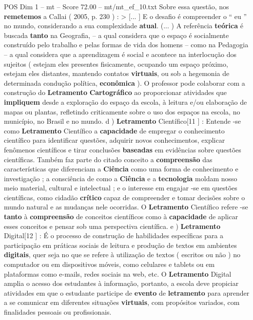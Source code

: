 \begin{textsample}{POS Dim 1 – mt – Score 72.00 – mt/mt\_ef\_10.txt}
Sobre essa questão, nos \textbf{remetemos} a Callai ( 2005, p. 230 ) : > [... ] E o desafio é compreender o “ eu ” no mundo, considerando a sua complexidade \textbf{atual}. (... ) A referência \textbf{teórica} é buscada \textbf{tanto} na Geografia, – a qual considera que o espaço é socialmente construído pelo trabalho e pelas formas de vida dos homens – como na Pedagogia – a qual considera que a aprendizagem é social e acontece na interlocução dos sujeitos ( estejam eles presentes fisicamente, ocupando um espaço próximo, estejam eles distantes, mantendo contatos \textbf{virtuais}, ou sob a hegemonia de determinada condução política, \textbf{econômica} ).
O professor pode colaborar com a construção do \textbf{Letramento} \textbf{Cartográfico} ao proporcionar atividades que \textbf{impliquem} desde a exploração do espaço da escola, à leitura e/ou elaboração de mapas ou plantas, refletindo criticamente sobre o uso dos espaços na escola, no município, no Brasil e no mundo. d ) \textbf{Letramento} Científico[11 ] : Entende -se como \textbf{Letramento} Científico a \textbf{capacidade} de empregar o conhecimento científico para identificar questões, adquirir novos conhecimentos, explicar fenômenos científicos e tirar conclusões \textbf{baseadas} em evidências sobre questões científicas.
Também faz parte do citado conceito a \textbf{compreensão} das características que diferenciam a \textbf{Ciência} como uma forma de conhecimento e investigação ; a consciência de como a \textbf{Ciência} e a \textbf{tecnologia} moldam nosso meio material, cultural e intelectual ; e o interesse em engajar -se em questões científicas, como cidadão \textbf{crítico} capaz de compreender e tomar decisões sobre o mundo natural e as mudanças nele ocorridas.
O \textbf{Letramento} Científico refere -se \textbf{tanto} à \textbf{compreensão} de conceitos científicos como à \textbf{capacidade} de aplicar esses conceitos e pensar sob uma perspectiva científica. e ) \textbf{Letramento} Digital[12 ] : É o processo de construção de habilidades específicas para a participação em práticas sociais de leitura e produção de textos em ambientes \textbf{digitais}, quer seja no que se refere à utilização de textos ( escritos ou não ) no computador ou em dispositivos móveis, como celulares e tablets ou em plataformas como e-mails, redes sociais na web, etc.
O \textbf{Letramento} Digital amplia o acesso dos estudantes à informação, portanto, a escola deve propiciar atividades em que o estudante participe de \textbf{evento} de \textbf{letramento} para aprender a se comunicar em diferentes situações \textbf{virtuais}, com propósitos variados, com finalidades pessoais ou profissionais.

\end{textsample}
